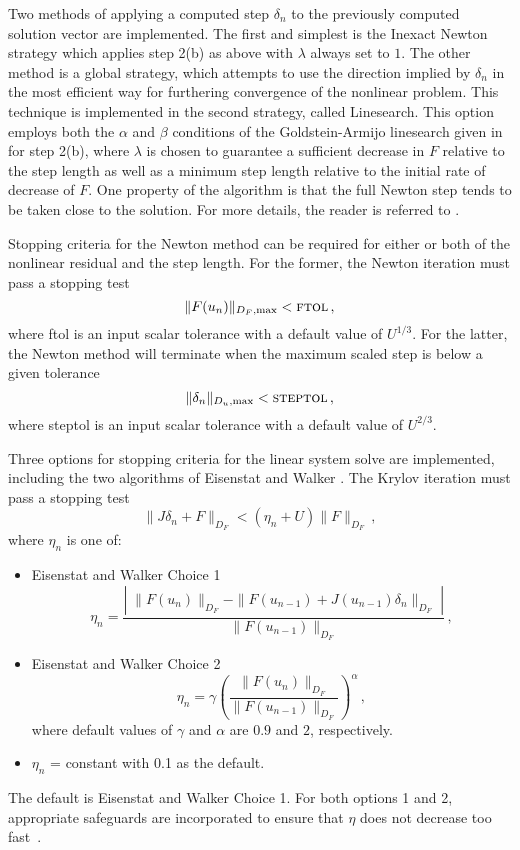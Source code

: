Two methods of applying a computed step $\delta_n$ to the
previously computed solution vector are implemented. The first and
simplest is the Inexact Newton strategy which applies step 2(b) as
above with $\lambda$ always set to $1$. The other method is a
global strategy, which attempts to use the direction implied by
$\delta_n$ in the most efficient way for furthering convergence of
the nonlinear problem. This technique is implemented in the second
strategy, called Linesearch.  This option employs both the
$\alpha$ and $\beta$ conditions of the Goldstein-Armijo linesearch
given in \cite{DeSc:96} for step 2(b), where $\lambda$ is chosen
to guarantee a sufficient decrease in $F$ relative to the step
length as well as a minimum step length relative to the initial
rate of decrease of $F$.  One property of the algorithm is that
the full Newton step tends to be taken close to the solution.  For
more details, the reader is referred to \cite{DeSc:96}.

Stopping criteria for the Newton method can be required for either or
both of the nonlinear residual and the step length.  For the former,
the Newton iteration must pass a stopping test
\[ \|F(u_n)\|_{D_F,\mbox{\scriptsize max}} < \mbox{\sc ftol} \, , \]
where {\sc ftol} is an input scalar tolerance with a default value of
$U^{1/3}$.
For the latter, the Newton method will terminate when the maximum scaled step
is below a given tolerance
\[ \|\delta_n\|_{D_u,\mbox{\scriptsize max}} < \mbox{\sc steptol} \, , \]
where {\sc steptol} is an input scalar tolerance with a default value of
$U^{2/3}$.

Three options for stopping criteria for the linear system solve are
implemented, including the two
algorithms of Eisenstat and Walker \cite{EiWa:96}.
The Krylov iteration must pass a stopping test
\[ \|J \delta_n + F\|_{D_F} < (\eta_n + U) \|F\|_{D_F} \, , \]
where $\eta_n$ is one of:
\begin{itemize}
\item Eisenstat and Walker Choice 1
  \[
  \eta_n = \frac{\left|\; \|F(u_n)\|_{D_F}
      - \|F(u_{n-1}) + J(u_{n-1}) \delta_n \|_{D_F}
      \; \right|}
  {\|F(u_{n-1})\|_{D_F}} \, ,
  \]
\item Eisenstat and Walker Choice 2
  \[
  \eta_n = \gamma
  \left( \frac{ \|F(u_n)\|_{D_F}}{\|F(u_{n-1})\|_{D_F}} \right)^{\alpha} \, ,
  \]
where default values of $\gamma$ and $\alpha$ are $0.9$ and $2$,
 respectively.
\item  $\eta_n$ = constant with 0.1 as the default.
\end{itemize}
The default is Eisenstat and Walker Choice 1. For both options 1 and 2,
appropriate safeguards are incorporated to ensure that $\eta$ does not
decrease too fast~\cite{EiWa:96}.

